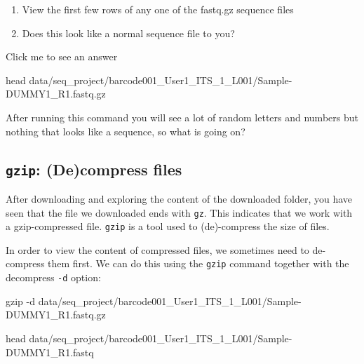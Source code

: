 \documentclass[
  letterpaper,
  DIV=11,
  numbers=noendperiod]{scrreprt}
\newenvironment{Shaded}{}{}
\newcommand{\AttributeTok}[1]{\textcolor[rgb]{0.84,0.23,0.29}{#1}}
\newcommand{\FunctionTok}[1]{\textcolor[rgb]{0.44,0.26,0.76}{#1}}
\newcommand{\NormalTok}[1]{\textcolor[rgb]{0.14,0.16,0.18}{#1}}
\providecommand{\tightlist}{%
  \setlength{\itemsep}{0pt}\setlength{\parskip}{0pt}}\usepackage{longtable,booktabs,array}
\begin{document}
\begin{tcolorbox}[enhanced jigsaw, breakable, left=2mm, title=\textcolor{quarto-callout-caution-color}{\faFire}\hspace{0.5em}{Exercise}, opacityback=0, opacitybacktitle=0.6, rightrule=.15mm, bottomrule=.15mm, colback=white, colframe=quarto-callout-caution-color-frame, coltitle=black, bottomtitle=1mm, arc=.35mm, toprule=.15mm, colbacktitle=quarto-callout-caution-color!10!white, toptitle=1mm, titlerule=0mm, leftrule=.75mm]

\begin{enumerate}
\def\labelenumi{\arabic{enumi}.}
\tightlist
\item
  View the first few rows of any one of the fastq.gz sequence files
\item
  Does this look like a normal sequence file to you?
\end{enumerate}

Click me to see an answer

\begin{Shaded}
\begin{Highlighting}[]
\FunctionTok{head}\NormalTok{ data/seq\_project/barcode001\_User1\_ITS\_1\_L001/Sample{-}DUMMY1\_R1.fastq.gz}
\end{Highlighting}
\end{Shaded}

After running this command you will see a lot of random letters and
numbers but nothing that looks like a sequence, so what is going on?

\end{tcolorbox}

\subsection{\texorpdfstring{\texttt{gzip}: (De)compress
files}{gzip: (De)compress files}}\label{gzip-decompress-files}

After downloading and exploring the content of the downloaded folder,
you have seen that the file we downloaded ends with \texttt{gz}. This
indicates that we work with a gzip-compressed file. \texttt{gzip} is a
tool used to (de)-compress the size of files.

In order to view the content of compressed files, we sometimes need to
de-compress them first. We can do this using the \texttt{gzip} command
together with the decompress \texttt{-d} option:

\begin{Shaded}
\begin{Highlighting}[]
\FunctionTok{gzip} \AttributeTok{{-}d}\NormalTok{ data/seq\_project/barcode001\_User1\_ITS\_1\_L001/Sample{-}DUMMY1\_R1.fastq.gz}

\FunctionTok{head}\NormalTok{ data/seq\_project/barcode001\_User1\_ITS\_1\_L001/Sample{-}DUMMY1\_R1.fastq}
\end{Highlighting}
\end{Shaded}
\end{document}
